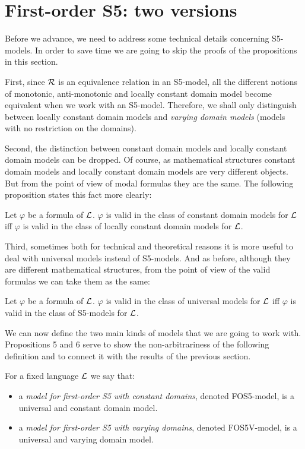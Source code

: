 \section{First-order S5: two versions}

\qquad Before we advance, we need to address some technical details concerning S5-models. In order to save time we are going to skip the proofs of the propositions in this section.  

\qquad First, since $\mathcal{R}$ is an equivalence relation in an S5-model, all the different notions of monotonic, anti-monotonic and locally constant domain model become equivalent when we work with an S5-model. Therefore, we shall only distinguish between locally constant domain models and \textit{varying domain models} (models with no restriction on the domains). 

\qquad Second, the distinction between constant domain models and locally constant domain models can be dropped. Of course, as mathematical structures constant domain models and locally constant domain models are very different objects. But from the point of view of modal formulas they are the same. The following proposition states this fact more clearly:

\begin{pro}
Let $\varphi$ be a formula of $\mathcal{L}$. $\varphi$ is valid in the class of constant domain models for $\mathcal{L}$ iff $\varphi$ is valid in the class of locally constant domain models for $\mathcal{L}$.
\end{pro}


\qquad Third, sometimes both for technical and theoretical reasons it is more useful to deal with universal models instead of S5-models. And as before, although they are different mathematical structures, from the point of view of the valid formulas we can take them as the same:

\begin{pro}
Let $\varphi$ be a formula of $\mathcal{L}$. $\varphi$ is valid in the class of universal models for $\mathcal{L}$ iff $\varphi$ is valid in the class of S5-models for $\mathcal{L}$. 
\end{pro}


\qquad We can now define the two main kinds of models that we are going to work with. Propositions 5 and 6 serve to show the non-arbitrariness of the following definition and to connect it with the results of the previous section. 

\begin{defn}
For a fixed language $\mathcal{L}$ we say that:
\begin{itemize}

\item a \textit{model for first-order S5 with constant domains}, denoted FOS5-model, is a universal and constant domain model.

\item a \textit{model for first-order S5 with varying domains}, denoted FOS5V-model, is a universal and varying domain model.
	
\end{itemize}
	
	
\end{defn}

